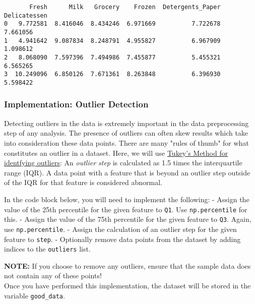 \documentclass[11pt]{article}
\begin{document}
    
    \begin{verbatim}
       Fresh      Milk   Grocery    Frozen  Detergents_Paper  Delicatessen
0   9.772581  8.416046  8.434246  6.971669          7.722678      7.661056
1   4.941642  9.087834  8.248791  4.955827          6.967909      1.098612
2   8.068090  7.597396  7.494986  7.455877          5.455321      6.565265
3  10.249096  6.850126  7.671361  8.263848          6.396930      5.598422
    \end{verbatim}

    
    \subsubsection{Implementation: Outlier
Detection}\label{implementation-outlier-detection}

Detecting outliers in the data is extremely important in the data
preprocessing step of any analysis. The presence of outliers can often
skew results which take into consideration these data points. There are
many "rules of thumb" for what constitutes an outlier in a dataset.
Here, we will use
\href{http://datapigtechnologies.com/blog/index.php/highlighting-outliers-in-your-data-with-the-tukey-method/}{Tukey's
Method for identfying outliers}: An \emph{outlier step} is calculated as
1.5 times the interquartile range (IQR). A data point with a feature
that is beyond an outlier step outside of the IQR for that feature is
considered abnormal.

In the code block below, you will need to implement the following: -
Assign the value of the 25th percentile for the given feature to
\texttt{Q1}. Use \texttt{np.percentile} for this. - Assign the value of
the 75th percentile for the given feature to \texttt{Q3}. Again, use
\texttt{np.percentile}. - Assign the calculation of an outlier step for
the given feature to \texttt{step}. - Optionally remove data points from
the dataset by adding indices to the \texttt{outliers} list.

\textbf{NOTE:} If you choose to remove any outliers, ensure that the
sample data does not contain any of these points!\\
Once you have performed this implementation, the dataset will be stored
in the variable \texttt{good\_data}.
\end{document}
